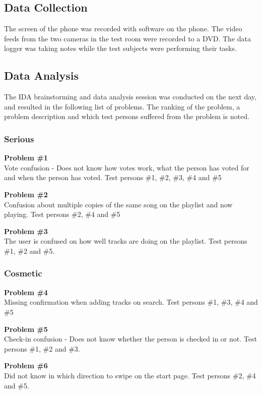 \subsection{Data Collection}
The screen of the phone was recorded with software on the phone. The
video feeds from the two cameras in the test room were recorded to a
DVD. The data logger was taking notes while the test subjects were
performing their tasks.

\subsection{Data Analysis}
The IDA brainstorming and data analysis session was conducted on the next
day, and resulted in the following list of problems. The ranking of
the problem, a problem description and which test persons suffered
from the problem is noted.

\subsubsection{Serious}
\textbf{Problem \#1}\\
    Vote confusion - Does not know how votes work, what the person has
    voted for and when the person has voted. Test persons \#1, \#2,
    \#3, \#4 and \#5

\noindent\textbf{Problem \#2}\\
    Confusion about multiple copies of the same song on the playlist
    and now playing. Test persons \#2, \#4 and \#5

\noindent\textbf{Problem \#3}\\
    The user is confused on how well tracks are doing on the
    playlist. Test persons \#1, \#2 and \#5.

\subsubsection{Cosmetic}
\textbf{Problem \#4}\\
    Missing confirmation when adding tracks on search. Test persons
    \#1, \#3, \#4 and \#5

\noindent\textbf{Problem \#5}\\
    Check-in confusion - Does not know whether the person is checked
    in or not. Test persons \#1, \#2 and \#3.

\noindent\textbf{Problem \#6}\\
    Did not know in which direction to swipe on the start page. Test
    persons \#2, \#4 and \#5.

